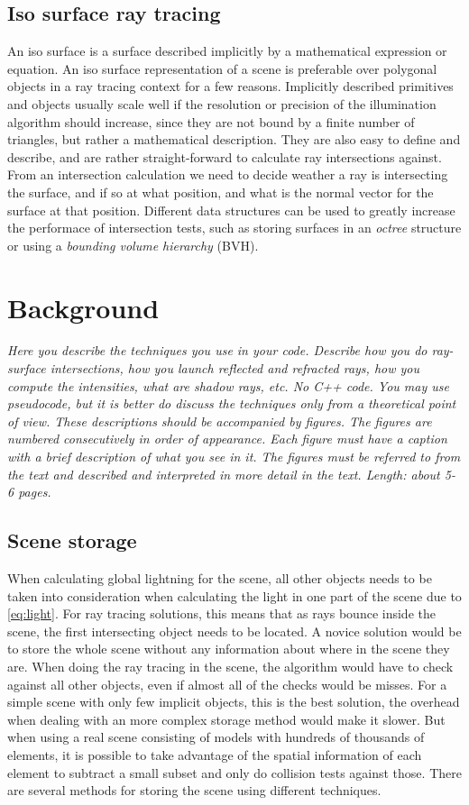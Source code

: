 \documentclass[]{report}   %
\begin{document}
\section{Iso surface ray tracing}
An iso surface is a surface described implicitly by a mathematical expression or equation. An iso surface representation of a scene is preferable over polygonal objects in a ray tracing context for a few reasons. Implicitly described primitives and objects usually scale well if the resolution or precision of the illumination algorithm should increase, since they are not bound by a finite number of triangles, but rather a mathematical description. They are also easy to define and describe, and are rather straight-forward to calculate ray intersections against. From an intersection calculation we need to decide weather a ray is intersecting the surface, and if so at what position, and what is the normal vector for the surface at that position. Different data structures can be used to greatly increase the performace of intersection tests, such as storing surfaces in an \emph{octree} structure or using a \emph{bounding volume hierarchy} (BVH).


\chapter{Background}
\emph{Here you describe the techniques you use in your code. 
Describe how you do ray-surface intersections, how you launch reflected and refracted rays, how you compute the intensities, what are shadow rays, etc. No C++ code. 
You may use pseudocode, but it is better do discuss the techniques only from a theoretical point of view. 
These descriptions should be accompanied by figures. 
The figures are numbered consecutively in order of appearance. 
Each figure must have a caption with a brief description of what you see in it. 
The figures must be referred to from the text and described and interpreted in more detail in the text.
Length: about 5-6 pages.}

\section{Scene storage}
When calculating global lightning for the scene, all other objects needs to be taken into consideration when calculating the light in one part of the scene due to \autoref{eq:light}.
For ray tracing solutions, this means that as rays bounce inside the scene, the first intersecting object needs to be located.
A novice solution would be to store the whole scene without any information about where in the scene they are.
When doing the ray tracing in the scene, the algorithm would have to check against all other objects, even if almost all of the checks would be misses.
For a simple scene with only few implicit objects, this is the best solution, the overhead when dealing with an more complex storage method would make it slower.
But when using a real scene consisting of models with hundreds of thousands of elements, it is possible to take advantage of the spatial information of each element to subtract a small subset and only do collision tests against those.
There are several methods for storing the scene using different techniques.
\end{document}
